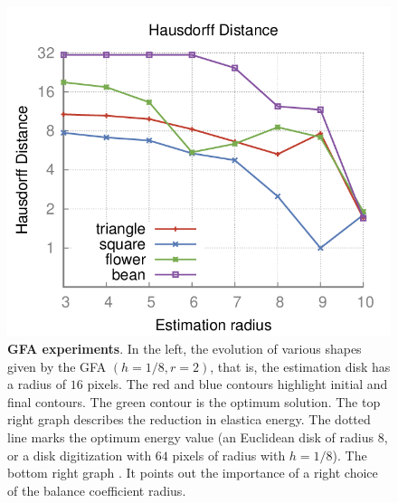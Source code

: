 \documentclass[review]{siamart220329}
\begin{document}
\begin{figure}
\begin{minipage}{0.75\textwidth}
\includegraphics[scale=0.22]{figures/hausdorff-distance/hausdorff-distance-plot.png}
\end{minipage}
\caption{\textbf{GFA experiments}. In the left, the evolution of various
shapes given by the GFA $(h=1/8,r=2)$, that is, the estimation disk has a
radius of $16$ pixels. The red and blue contours highlight initial and final
contours. The green contour is the optimum solution. The top right graph
describes the reduction in elastica energy. The dotted line marks the
optimum energy value (an Euclidean disk of radius $8$, or a disk
digitization with $64$ pixels of radius with $h=1/8$). The bottom right
graph . It points out the 
importance of a right choice of the balance coefficient radius.}
\label{fig:graph-flow-experiments}
\end{figure}
\end{document}
